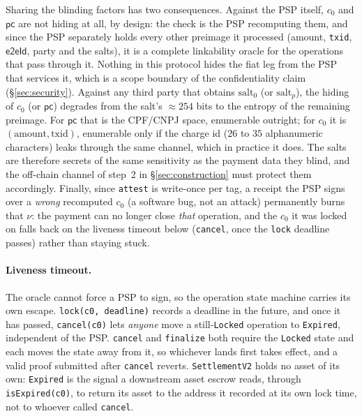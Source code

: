 \documentclass[11pt]{article}
\newcommand{\eeid}{\ensuremath{\mathsf{e2eId}}}
\newcommand{\code}[1]{\texttt{#1}}
\begin{document}
Sharing the blinding factors has two consequences. Against the PSP itself,
$c_0$ and $\mathsf{pc}$ are not hiding at all, by design: the check is the PSP
recomputing them, and since the PSP separately holds every other preimage it
processed (amount, \code{txid}, \eeid, party and the salts), it is a complete
linkability oracle for the operations that pass through it. Nothing in this
protocol hides the fiat leg from the PSP that services it, which is a scope
boundary of the confidentiality claim (\S\ref{sec:security}). Against any third
party that obtains $\text{salt}_0$ (or $\text{salt}_p$), the hiding of $c_0$ (or
$\mathsf{pc}$) degrades from the salt's $\approx 254$ bits to the entropy of the
remaining preimage. For $\mathsf{pc}$ that is the CPF/CNPJ space, enumerable
outright; for $c_0$ it is $(\text{amount}, \text{txid})$, enumerable only if the
charge id ($26$ to $35$ alphanumeric characters) leaks through the same channel,
which in practice it does. The salts are therefore secrets of the same
sensitivity as the payment data they blind, and the off-chain channel of step~2
in \S\ref{sec:construction} must protect them accordingly. Finally, since
\code{attest} is write-once per tag, a receipt the PSP signs over a \emph{wrong}
recomputed $c_0$ (a software bug, not an attack) permanently burns that $\nu$:
the payment can no longer close \emph{that} operation, and the $c_0$ it was
locked on falls back on the liveness timeout below (\code{cancel}, once the
\code{lock} deadline passes) rather than staying stuck.

\paragraph{Liveness timeout.}
The oracle cannot force a PSP to sign, so the operation state machine carries
its own escape. \code{lock(c0, deadline)} records a deadline in the future, and
once it has passed, \code{cancel(c0)} lets \emph{anyone} move a
still-\code{Locked} operation to \code{Expired}, independent of the PSP.
\code{cancel} and \code{finalize} both require the \code{Locked} state and each
moves the state away from it, so whichever lands first takes effect, and a
valid proof submitted after \code{cancel} reverts. \code{SettlementV2} holds no
asset of its own: \code{Expired} is the signal a downstream asset escrow reads,
through \code{isExpired(c0)}, to return its asset to the address it recorded at
its own lock time, not to whoever called \code{cancel}.
\end{document}

